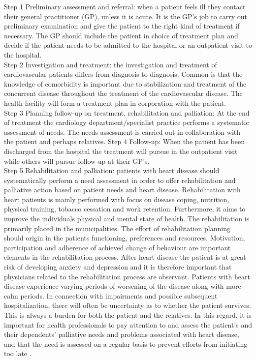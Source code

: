 Step 1 Preliminary assessment and referral: when a patient feels ill they contact their general practitioner (GP), unless it is acute. It is the GP's job to carry out preliminary examination and give the patient to the right kind of treatment if necessary. The GP should include the patient in choice of treatment plan and decide if the patient needs to be admitted to the hospital or an outpatient visit to the hospital.\\
Step 2 Investigation and treatment: the investigation and treatment of cardiovascular patients differs from diagnosis to diagnosis. Common is that the knowledge of comorbidity is important due to stabilization and treatment of the concurrent disease throughout the treatment of the cardiovascular disease. The health facility will form a treatment plan in corporation with the patient. \\
Step 3 Planning follow-up on treatment, rehabilitation and palliation: At the end of treatment the cardiology department/specialist practice performs a systematic assessment of needs. The needs assessment is carried out in collaboration with the patient and perhaps relatives. 
Step 4 Follow-up: When the patient has been discharged from the hospital the treatment will pursue in the outpatient visit while others will pursue follow-up at their GP's. \\
Step 5 Rehabilitation and palliation: patients with heart disease should systematically perform a need assessment in order to offer rehabilitation and palliative action based on patient needs and heart disease. Rehabilitation with heart patients is mainly performed with focus on disease coping, nutrition, physical training, tobacco cessation and work retention. Furthermore, it aims to improve the individuals physical and mental state of health. The rehabilitation is primarily placed in the municipalities. The effort of rehabilitation planning should origin in the patients functioning, preferences and resources. Motivation, participation and adherence of achieved change of behaviour are important elements in the rehabilitation process. After heart disease the patient is at great risk of developing anxiety and depression and it is therefore important that physicians related to the rehabilitation process are observant. 
Patients with heart disease experience varying periods of worsening of the disease along with more calm periods. In connection with impairments and possible subsequent hospitalization, there will often be uncertainty as to whether the patient survives. This is always a burden for both the patient and the relatives. In this regard, it is important for health professionals to pay attention to and assess the patient's and their dependents' palliative needs and problems associated with heart disease, and that the need is assessed on a regular basis to prevent efforts from initiating too late \cite{behandlingsforlob}.

